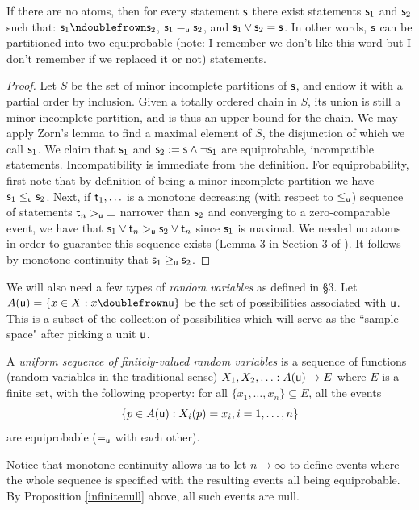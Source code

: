 \documentclass[10pt, onecolumn, longbibliography, nofootinbib]{revtex4-2}
\begin{document}
\begin{prop}
\label{split}
If there are no atoms, then for every statement $\stmt$ there exist statements $\stmt_1$ and $\stmt_2$ such that: $\stmt_1\ncomp \stmt_2$, $\stmt_1\equ\stmt_2$, and $\stmt_1\OR\stmt_2 = \stmt$. In other words, $\stmt$ can be partitioned into two equiprobable (note: I remember we don't like this word but I don't remember if we replaced it or not) statements. 
\end{prop}
\begin{proof}
Let $S$ be the set of minor incomplete partitions of $\stmt$, and endow it with a partial order by inclusion. Given a totally ordered chain in $S$, its union is still a minor incomplete partition, and is thus an upper bound for the chain. We may apply Zorn's lemma to find a maximal element of $S$, the disjunction of which we call $\stmt_1$. We claim that $\stmt_1$ and $\stmt_2:= \stmt\AND\NOT\stmt_1$ are equiprobable, incompatible statements. Incompatibility is immediate from the definition. For equiprobability, first note that by definition of being a minor incomplete partition we have $\stmt_1\lequ\stmt_2$. Next, if $\stmt[t]_1,\ldots$ is a monotone decreasing (with respect to $\lequ$) sequence of statements $\stmt[t]_n>_{\stmt[u]}\impossibility$ narrower than $\stmt_2$ and converging to a zero-comparable event, we have that $\stmt_1\OR\stmt[t]_n>_{\stmt[u]}\stmt_2\OR\stmt[t]_n$ since $\stmt_1$ is maximal. We needed no atoms in order to guarantee this sequence exists (Lemma 3 in Section 3 of \cite{villegas}). It follows by monotone continuity that $\stmt_1\geq_{\stmt[u]} \stmt_2$. 
\end{proof}

We will also need a few types of \emph{random variables} as defined in \cite{villegas} \S3. Let $A({\stmt[u]}) = \{x \in X : x \comp \stmt[u]\}$ be the set of possibilities associated with $\stmt[u]$. This is a subset of the collection of possibilities which will serve as the ``sample space" after picking a unit $\stmt[u]$.

A \emph{uniform sequence of finitely-valued random variables} is a sequence of functions (random variables in the traditional sense) $X_1,X_2,\ldots: A({\stmt[u]})\to E$ where $E$ is a finite set, with the following property: for all $\{x_1,\ldots,x_n\}\subseteq E$, all the events $$\{p\in A({\stmt[u]}): X_i(p) = x_i, i=1,\ldots,n\}$$
are equiprobable ($\equ$ with each other). 

Notice that monotone continuity allows us to let $n\to\infty$ to define events where the whole sequence is specified with the resulting events all being equiprobable. By Proposition \ref{infinitenull} above, all such events are null.
\end{document}
